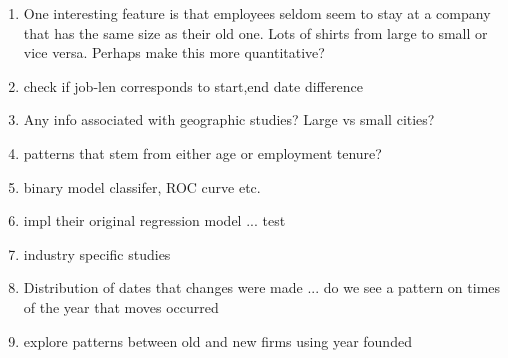 \documentclass[10pt]{article}
\begin{document}
\begin{enumerate}
    \item One interesting feature is that employees seldom seem to stay at a company that has the 
          same size as their old one.  Lots of shirts from large to small or vice versa.  Perhaps 
          make this more quantitative? 
    \item  check if job-len corresponds to start,end date difference 
    \item Any info associated with geographic studies?  Large vs small cities? 
    \item  patterns that stem from either age or employment tenure? 
    \item binary model classifer, ROC curve etc. 
    \item impl their original regression model ... test 
    \item  industry specific studies 
    \item Distribution of dates that changes were made ... do we see a pattern on times of the 
          year that moves occurred 
    \item explore patterns between old and new firms using year founded 
\end{enumerate}
\end{document}
